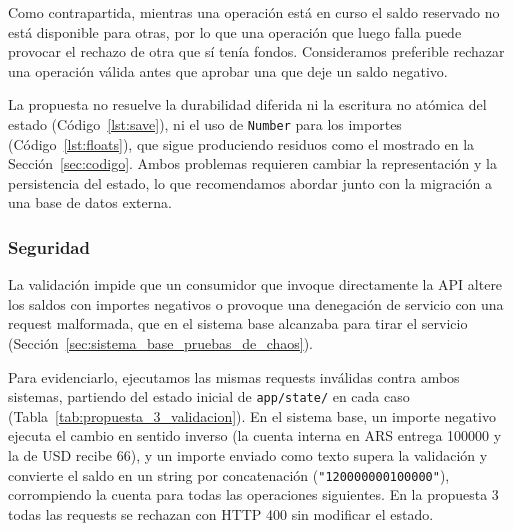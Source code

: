         Como contrapartida, mientras una operación está en curso el saldo reservado no está disponible para otras, por lo que
        una operación que luego falla puede provocar el rechazo de otra que sí tenía fondos. Consideramos preferible rechazar
        una operación válida antes que aprobar una que deje un saldo negativo.

        La propuesta no resuelve la durabilidad diferida ni la escritura no atómica del estado (Código~\ref{lst:save}),
        ni el uso de \texttt{Number} para los importes (Código~\ref{lst:floats}), que sigue produciendo residuos como el
        mostrado en la Sección~\ref{sec:codigo}. Ambos problemas requieren cambiar la representación y la persistencia del estado, lo que recomendamos
        abordar junto con la migración a una base de datos externa.

        \subsubsection{Seguridad}
        \label{sec:propuesta_3_seguridad}

        La validación impide que un consumidor que invoque directamente la API altere los saldos con importes negativos o
        provoque una denegación de servicio con una request malformada, que en el sistema base alcanzaba para tirar el
        servicio (Sección~\ref{sec:sistema_base_pruebas_de_chaos}).

        Para evidenciarlo, ejecutamos las mismas requests inválidas contra ambos sistemas, partiendo del estado inicial
        de \texttt{app/state/} en cada caso (Tabla~\ref{tab:propuesta_3_validacion}). En el sistema base, un importe
        negativo ejecuta el cambio en sentido inverso (la cuenta interna en ARS entrega 100000 y la de USD recibe 66), y un
        importe enviado como texto supera la validación y convierte el saldo en un string por concatenación
        (\texttt{"120000000100000"}), corrompiendo la cuenta para todas las operaciones siguientes. En la propuesta 3 todas
        las requests se rechazan con HTTP 400 sin modificar el estado.

